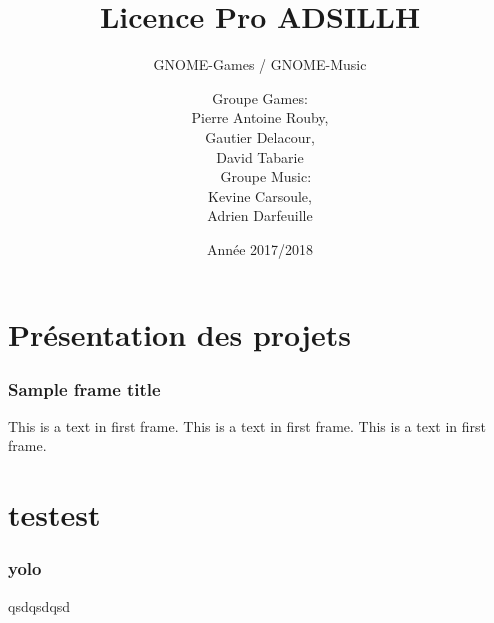 \documentclass{beamer}
\title{Licence Pro ADSILLH}
\subtitle{GNOME-Games / GNOME-Music}
\author{Groupe Games:\\ Pierre Antoine Rouby,\\ Gautier Delacour,\\
  David Tabarie\\\
  \vspace{0.8cm}
  Groupe Music:\\ Kevine Carsoule,\\ Adrien Darfeuille}
\date{Année 2017/2018}
\begin{document}
\frame{\titlepage}

\section{Présentation des projets}
\begin{frame}
\frametitle{Sample frame title}
This is a text in first frame. This is a text in first frame. This is a text in first frame.
\end{frame}

\section{testest}
\begin{frame}
  \frametitle{yolo}
  qsdqsdqsd
\end{frame}
 
\end{document}
